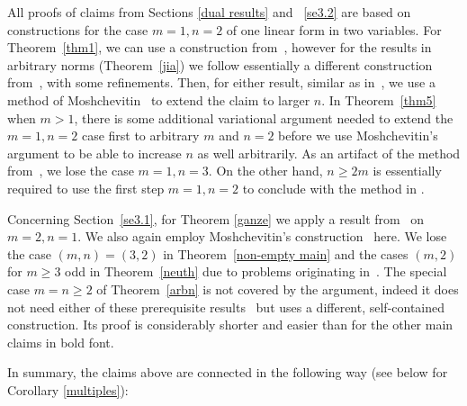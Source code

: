 \documentclass[10pt]{amsart}
\theoremstyle{definition}
\begin{document}
All proofs of claims from Sections 
 \ref{dual results} and ~\ref{se3.2} are based on constructions for the case $m=1, n=2$ of one linear form in two variables. For Theorem~\ref{thm1}, we can use a construction from~\cite{j2}, however for the results in arbitrary norms (Theorem~\ref{jia}) we follow 
essentially a different construction from~\cite{j3}, with some refinements.
Then, for either result, similar as in~\cite{j3}, we use a method of Moshchevitin~\cite{ngm}
to extend the claim to larger $n$. In Theorem~\ref{thm5} when $m>1$, 
there is some additional variational argument needed to extend the $m=1, n=2$
case first to arbitrary $m$ and $n=2$ before we use Moshchevitin's argument
to be able to increase $n$ as well arbitrarily. As an artifact of the method
from~\cite{ngm}, 
we lose the case $m=1, n=3$.
On the other hand, $n\ge 2m$ is essentially required to use the first step $m=1, n=2$ to conclude with the method in \cite{ngm}. 

Concerning Section~\ref{se3.1},
for Theorem \ref{ganze} we apply
a result from~\cite{j1} on $m=2, n=1$. 
We also again employ Moshchevitin's construction~\cite{ngm} here.  
We 
lose the case $(m,n)=(3,2)$ in Theorem~\ref{non-empty main} and the cases $(m,2)$ for $m\ge 3$ odd in Theorem~\ref{neuth}
due to problems originating in~\cite{j1}.
The special case $m=n\ge 2$ of Theorem~\ref{arbn} is not covered by the argument, indeed it does not need either of these prerequisite results~\cite{ngm, j1} but uses a different, self-contained construction. Its proof is considerably
shorter and easier than for the other main claims in bold font.

In summary, the claims above are connected in the following way (see below
for Corollary \ref{multiples}):
\medskip
\end{document}
